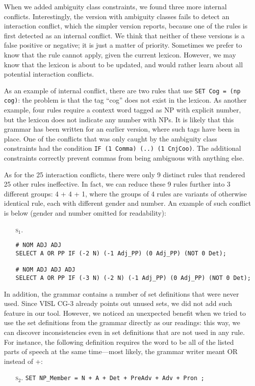 When we added ambiguity class constraints, we found three more internal conflicts.
Interestingly, the version with ambiguity classes fails to detect an interaction conflict, which the simpler version reports, because one of the rules is first detected as an internal conflict. 
We think that neither of these versions is a false positive or negative; it is just a matter of priority. Sometimes we prefer to know that the rule cannot apply, given the current lexicon. 
However, we may know that the lexicon is about to be updated, and would rather learn about all potential interaction conflicts.

As an example of internal conflict, there are two rules that use \texttt{SET Cog = (np cog)}: the problem is that the tag ``cog'' does not exist in the lexicon. As another example, four rules require a context word tagged as NP with explicit number, but the lexicon does not indicate any number with NPs. It is likely that this grammar has been written for an earlier version, where such tags have been in place.
One of the conflicts that was only caught by the ambiguity class constraints had the condition \texttt{IF (1 Comma) (..) (1 CnjCoo)}. The additional constraints correctly prevent commas from being ambiguous with anything else.

As for the 25 interaction conflicts, there were only 9 distinct rules that rendered 25 other rules ineffective.
In fact, we can reduce these 9 rules further into 3 different groups: 4 + 4 + 1, where the groups of 4 rules are variants of otherwise identical rule, each with different gender and number.
An example of such conflict is below (gender and number omitted for readability):

\begin{itemize}
\item[\textsc{s$_{1}$.}] 
\begin{verbatim}
# NOM ADJ ADJ
SELECT A OR PP IF (-2 N) (-1 Adj_PP) (0 Adj_PP) (NOT 0 Det);

# NOM ADJ ADJ ADJ
SELECT A OR PP IF (-3 N) (-2 N) (-1 Adj_PP) (0 Adj_PP) (NOT 0 Det);
\end{verbatim}
\end{itemize}


In addition, the grammar contains a number of set definitions that were never
used. Since VISL CG-3 already points out unused sets, we did not add such
feature in our tool. However, we noticed an unexpected benefit when
we tried to use the set definitions from the grammar directly as our
readings: this way, we can discover inconsistencies even in
set definitions that are not used in any rule.
For instance, the following definition requires the word to be all of
the listed parts of speech at the same time---most likely, the grammar writer meant 
OR instead of +:
\begin{itemize}
\item[\textsc{s$_2$.}] 
\texttt{SET NP\_Member = N + A + Det + PreAdv + Adv + Pron ;}
\end{itemize}

